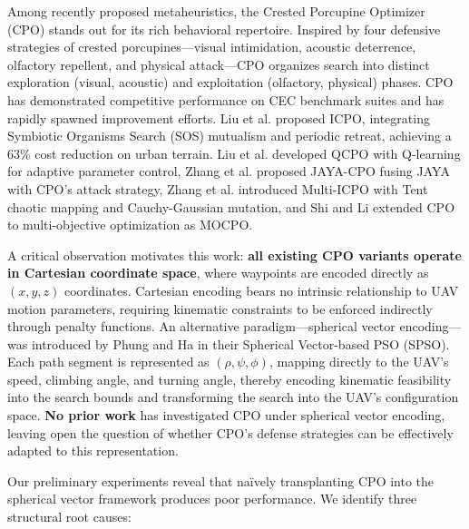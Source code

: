 \documentclass[11pt,a4paper]{article}
\begin{document}
Among recently proposed metaheuristics, the Crested Porcupine Optimizer (CPO) \cite{cpo2024} stands out for its rich behavioral repertoire. Inspired by four defensive strategies of crested porcupines---visual intimidation, acoustic deterrence, olfactory repellent, and physical attack---CPO organizes search into distinct exploration (visual, acoustic) and exploitation (olfactory, physical) phases. CPO has demonstrated competitive performance on CEC benchmark suites and has rapidly spawned improvement efforts. Liu et al. \cite{icpo2024} proposed ICPO, integrating Symbiotic Organisms Search (SOS) mutualism and periodic retreat, achieving a 63\% cost reduction on urban terrain. Liu et al. \cite{qcpo2025} developed QCPO with Q-learning for adaptive parameter control, Zhang et al. \cite{jayacpo2025} proposed JAYA-CPO fusing JAYA with CPO's attack strategy, Zhang et al. \cite{multiicpo2026} introduced Multi-ICPO with Tent chaotic mapping and Cauchy-Gaussian mutation, and Shi and Li \cite{mocpo2026} extended CPO to multi-objective optimization as MOCPO.

A critical observation motivates this work: \textbf{all existing CPO variants operate in Cartesian coordinate space}, where waypoints are encoded directly as $(x, y, z)$ coordinates. Cartesian encoding bears no intrinsic relationship to UAV motion parameters, requiring kinematic constraints to be enforced indirectly through penalty functions. An alternative paradigm---spherical vector encoding---was introduced by Phung and Ha \cite{sps2021} in their Spherical Vector-based PSO (SPSO). Each path segment is represented as $(\rho, \psi, \phi)$, mapping directly to the UAV's speed, climbing angle, and turning angle, thereby encoding kinematic feasibility into the search bounds and transforming the search into the UAV's configuration space. \textbf{No prior work} has investigated CPO under spherical vector encoding, leaving open the question of whether CPO's defense strategies can be effectively adapted to this representation.

Our preliminary experiments reveal that na\"ively transplanting CPO into the spherical vector framework produces poor performance. We identify three structural root causes:
\end{document}
